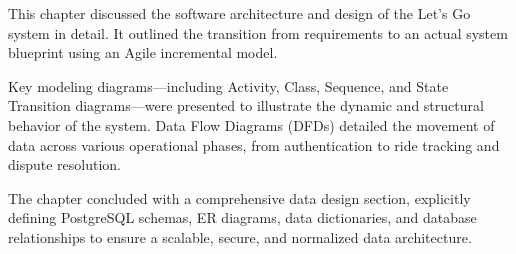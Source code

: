 This chapter discussed the software architecture and design of the Let’s Go system in detail. It outlined the transition from requirements to an actual system blueprint using an Agile incremental model. 

Key modeling diagrams—including Activity, Class, Sequence, and State Transition diagrams—were presented to illustrate the dynamic and structural behavior of the system. Data Flow Diagrams (DFDs) detailed the movement of data across various operational phases, from authentication to ride tracking and dispute resolution. 

The chapter concluded with a comprehensive data design section, explicitly defining PostgreSQL schemas, ER diagrams, data dictionaries, and database relationships to ensure a scalable, secure, and normalized data architecture.